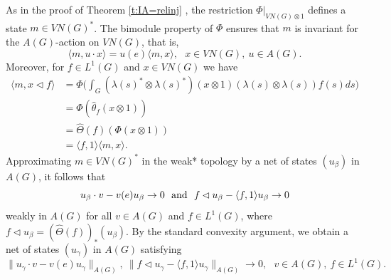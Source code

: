 \documentclass[preprint,12pt]{elsarticle}
\newcommand{\la}{\langle}
\newcommand{\ra}{\rangle}
\newcommand{\LG}{VN(G)}
\newcommand{\LO}{L^1(G)}
\newcommand{\lm}{\lambda}
\newcommand{\ten}{\otimes}
\newcommand{\h}[1]{\widehat{#1}}
\providecommand{\norm}[1]{\lVert#1\rVert}
\begin{document}
\begin{pf}
As in the proof of Theorem \ref{t:IA=relinj}   , the restriction $\Phi|_{\LG\ten 1}$ defines a state $m\in\LG^*$. The bimodule property of $\Phi$ ensures that $m$ is invariant for the $A(G)$-action on $\LG$, that is,
$$\la m,u\cdot x\ra=u(e)\la m,x\ra, \ \ \ x\in\LG, \ u\in A(G).$$
Moreover, for $f\in\LO$ and $x\in\LG$ we have
\begin{align*}\la m,x\lhd f\ra&=\Phi\bigg(\int_G (\lm(s)^*\ten\lm(s)^*)(x\ten1)(\lm(s)\ten\lm(s))f(s)ds\bigg)\\
&=\Phi(\h{\theta}_f(x\ten 1))\\
&=\h{\Theta}(f)(\Phi(x\ten 1))\\
&=\la f,1\ra\la m,x\ra.
\end{align*}
Approximating $m\in VN(G)^*$ in the weak* topology by a net of states $(u_\beta)$ in $A(G)$, it follows that
$$u_\beta\cdot v-v(e)u_\beta\rightarrow 0 \ \ \textnormal{and} \ \ f\lhd u_\beta-\la f,1\ra u_\beta\rightarrow 0$$
weakly in $A(G)$ for all $v\in A(G)$ and $f\in\LO$, where $f\lhd u_\beta=(\h{\Theta}(f))_*(u_\beta)$. By the standard convexity argument, we obtain a net of states $(u_\gamma)$ in $A(G)$ satisfying
\begin{equation}\label{e:L1inv}\norm{u_\gamma\cdot v-v(e)u_\gamma}_{A(G)}, \ \norm{f\lhd u_\gamma-\la f,1\ra u_\gamma}_{A(G)}\rightarrow0, \ \ \ v\in A(G), \ f\in\LO.\end{equation}


\end{pf}
\end{document}
